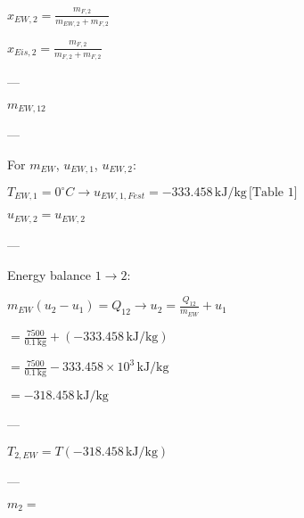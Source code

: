\( x_{EW,2} = \frac{m_{F,2}}{m_{EW,2} + m_{F,2}} \)

\( x_{Eis,2} = \frac{m_{F,2}}{m_{F,2} + m_{F,2}} \)

---

\( m_{EW,12} \)

---

For \( m_{EW} \), \( u_{EW,1} \), \( u_{EW,2} \):

\( T_{EW,1} = 0^\circ C \rightarrow u_{EW,1,Fest} = -333.458 \, \text{kJ/kg} \, \text{[Table 1]} \)

\( u_{EW,2} = u_{EW,2} \)

---

Energy balance \( 1 \rightarrow 2 \):

\( m_{EW} (u_2 - u_1) = Q_{12} \rightarrow u_2 = \frac{Q_{12}}{m_{EW}} + u_1 \)

\( = \frac{7500}{0.1 \, \text{kg}} + (-333.458 \, \text{kJ/kg}) \)

\( = \frac{7500}{0.1 \, \text{kg}} - 333.458 \times 10^3 \, \text{kJ/kg} \)

\( = -318.458 \, \text{kJ/kg} \)

---

\( T_{2,EW} = T(-318.458 \, \text{kJ/kg}) \)

---

\( m_2 = \)